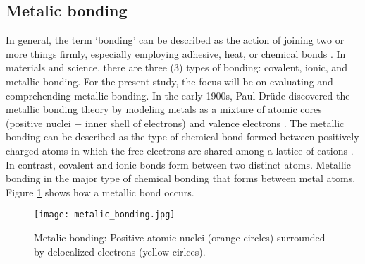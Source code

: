 \subsection{Metalic bonding}
In general, the term ‘bonding’ can be described as the action of joining two or more things firmly, especially employing adhesive, heat, or chemical bonds \cite{soler2000metallic}. In materials and science, there are three (3) types of bonding: covalent, ionic, and metallic bonding. For the present study, the focus will be on evaluating and comprehending metallic bonding.
In the early 1900s, Paul Drüde discovered the metallic bonding theory by modeling metals as a mixture of atomic cores (positive nuclei + inner shell of electrons) and valence electrons \cite{sinex2017general}. The metallic bonding can be described as the type of chemical bond formed between positively charged atoms in which the free electrons are shared among a lattice of cations \cite{lepetit2017topological}. In contrast, covalent and ionic bonds form between two distinct atoms. Metallic bonding in the major type of chemical bonding that forms between metal atoms. Figure \ref{ch3:figure:bonding} shows how a metallic bond occurs.

\begin{figure}[H]
    \centering
    \texttt{[image: metalic\_bonding.jpg]}
    \caption{Metalic bonding: Positive atomic nuclei (orange circles) surrounded by delocalized electrons (yellow cirlces)\cite{soler2000metallic}.}
    \label{ch3:figure:bonding}
\end{figure}


